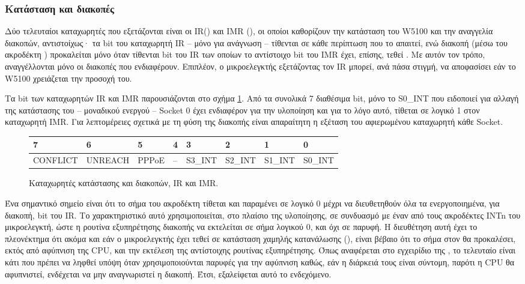 \subsubsection{Κατάσταση και διακοπές}
\label{ssubsec:network:ir_imr}

Δύο τελευταίοι καταχωρητές που εξετάζονται είναι οι IR()
και IMR (), οι οποίοι καθορίζουν την κατάσταση
του W5100 και την αναγγελία διακοπών, αντιστοίχως· τα bit του καταχωρητή IR --
μόνο για ανάγνωση -- τίθενται σε κάθε περίπτωση που το απαιτεί, ενώ διακοπή
(μέσω του ακροδέκτη ) προκαλείται μόνο όταν τίθενται bit του IR των
οποίων το αντίστοιχο bit του IMR έχει, επίσης, τεθεί
\parencite[21--22]{wiz11:w5100}. Με αυτόν τον τρόπο, αναγγέλλονται μόνο οι
διακοπές που ενδιαφέρουν. Επιπλέον, ο μικροελεγκτής εξετάζοντας τον IR μπορεί,
ανά πάσα στιγμή, να αποφασίσει εάν το W5100 χρειάζεται την προσοχή του.

Τα bit των καταχωρητών IR και IMR παρουσιάζονται στο σχήμα
\ref{fig:network:ir_imr}. Από τα συνολικά 7 διαθέσιμα bit, μόνο το S0\_INT που
ειδοποιεί για αλλαγή της κατάστασης του  -- μοναδικού ενεργού -- Socket 0 έχει
ενδιαφέρον για την υλοποίηση και για το λόγο αυτό, τίθεται σε λογικό 1 στον
καταχωρητή IMR. Για λεπτομέρειες σχετικά με τη φύση της διακοπής είναι
απαραίτητη η εξέταση του αφιερωμένου καταχωρητή κάθε Socket.

\begin{figure}
    \caption{Καταχωρητές κατάστασης και διακοπών, IR και IMR.
    \label{fig:network:ir_imr}}
    \begin{center}\begin{tabu} spread 0pt {|*8{X[-1,C]|}}

    \hline
    \rowfont\bfseries
           7 &       6 &     5 &  4 &       3 &       2 &       1 &       0   \\
    \hline
    CONFLICT & UNREACH & PPPoE & -- & S3\_INT & S2\_INT & S1\_INT & S0\_INT   \\
    \hline
    \end{tabu}\end{center}
\end{figure}

Ένα σημαντικό σημείο είναι ότι το σήμα του ακροδέκτη  τίθεται και
παραμένει σε λογικό 0 μέχρι να διευθετηθούν όλα τα ενεργοποιημένα, για διακοπή,
bit του IR. Το χαρακτηριστικό αυτό χρησιμοποιείται, στο πλαίσιο της υλοποίησης,
σε συνδυασμό με έναν από τους ακροδέκτες INTn του μικροελεγκτή, ώστε η ρουτίνα
εξυπηρέτησης διακοπής να εκτελείται σε σήμα λογικού 0, και όχι σε παρυφή. Η
διευθέτηση αυτή έχει το πλεονέκτημα ότι ακόμα και εάν ο μικροελεγκτής έχει τεθεί
σε κατάσταση χαμηλής κατανάλωσης (), είναι βέβαιο ότι το σήμα
στον  θα προκαλέσει, εκτός από αφύπνιση της CPU, και την εκτέλεση της
αντίστοιχης ρουτίνας εξυπηρέτησης. Όπως αναφέρεται στο εγχειρίδιο της
\textcite[71]{atmel13}, το τελευταίο είναι κάτι που πρέπει να ληφθεί υπόψη όταν
χρησιμοποιούνται παρυφές για την αφύπνιση καθώς, εάν η διάρκειά τους είναι
σύντομη, παρότι η CPU θα αφυπνιστεί, ενδέχεται να μην αναγνωριστεί η διακοπή.
Έτσι, εξαλείφεται αυτό το ενδεχόμενο.


